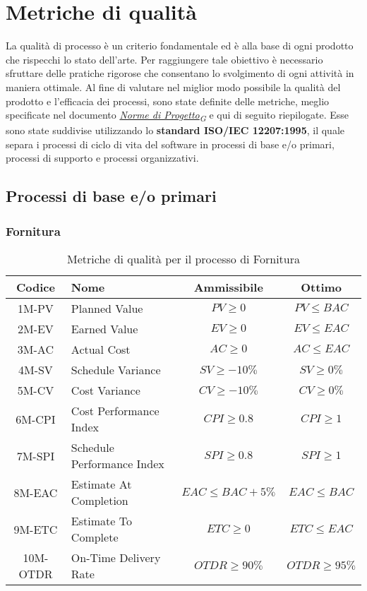 \section{Metriche di qualità}
La qualità di processo è un criterio fondamentale ed è alla base di ogni prodotto che rispecchi lo stato dell'arte. Per raggiungere tale obiettivo è necessario sfruttare delle pratiche rigorose che consentano lo svolgimento di ogni attività in maniera ottimale. Al fine di valutare nel miglior modo possibile la qualità del prodotto e l'efficacia dei processi, sono state definite delle metriche, meglio specificate nel documento \href{https://7last.github.io/docs/rtb/documentazione-interna/glossario#norme-di-progetto}{\textit{Norme di Progetto\textsubscript{G}}} e qui di seguito riepilogate. Esse sono state suddivise utilizzando lo \textbf{standard ISO/IEC 12207:1995}, il quale separa i processi di ciclo di vita del software in processi di base e/o primari, processi di supporto e processi organizzativi.



\subsection{Processi di base e/o primari}
\subsubsection{Fornitura}
\begin{table}[h!]
	\centering
	\begin{tabular}{ | c | l | c | c | }
		\hline
		Codice   & Nome                       & Ammissibile          & Ottimo           \\
		\hline
		1M-PV    & Planned Value              & $PV \geq 0$          & $PV \leq BAC$    \\
		2M-EV    & Earned Value               & $EV \geq 0$          & $EV \leq EAC$    \\
		3M-AC    & Actual Cost                & $AC \geq 0$          & $AC \leq EAC$    \\
		4M-SV    & Schedule Variance          & $SV \geq -10\%$      & $SV \geq 0\%$    \\
		5M-CV    & Cost Variance              & $CV \geq -10\%$      & $CV \geq 0\%$    \\
		6M-CPI   & Cost Performance Index     & $CPI \geq 0.8$       & $CPI \geq 1$     \\
		7M-SPI   & Schedule Performance Index & $SPI \geq 0.8$       & $SPI \geq 1$     \\
		8M-EAC   & Estimate At Completion     & $EAC \leq BAC + 5\%$ & $EAC \leq BAC$   \\
		9M-ETC   & Estimate To Complete       & $ETC \geq 0$         & $ETC \leq EAC$   \\
		10M-OTDR & On-Time Delivery Rate      & $OTDR \geq 90\%$     & $OTDR \geq 95\%$ \\
		\hline
	\end{tabular}
	\caption{Metriche di qualità per il processo di Fornitura}
\end{table}

